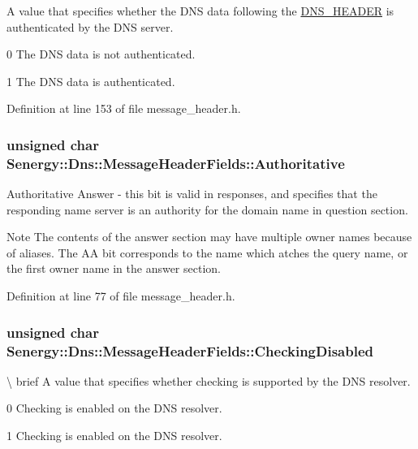 A value that specifies whether the D\-N\-S data following the \hyperlink{struct_d_n_s___h_e_a_d_e_r}{D\-N\-S\-\_\-\-H\-E\-A\-D\-E\-R} is authenticated by the D\-N\-S server. 

0 The D\-N\-S data is not authenticated.

1 The D\-N\-S data is authenticated. 

Definition at line 153 of file message\-\_\-header.\-h.

\hypertarget{struct_senergy_1_1_dns_1_1_message_header_fields_a706fe34b459a6aaacc28f0249213b013}{
\subsubsection[{Authoritative}]{\setlength{\rightskip}{0pt plus 5cm}unsigned char Senergy\-::\-Dns\-::\-Message\-Header\-Fields\-::\-Authoritative}}\label{struct_senergy_1_1_dns_1_1_message_header_fields_a706fe34b459a6aaacc28f0249213b013}


Authoritative Answer -\/ this bit is valid in responses, and specifies that the responding name server is an authority for the domain name in question section. 

\begin{DoxyNote}{Note}
The contents of the answer section may have multiple owner names because of aliases. The A\-A bit corresponds to the name which atches the query name, or the first owner name in the answer section. 
\end{DoxyNote}


Definition at line 77 of file message\-\_\-header.\-h.

\hypertarget{struct_senergy_1_1_dns_1_1_message_header_fields_a2c846064b4582f46a94bd90b32ef1cd9}{
\subsubsection[{Checking\-Disabled}]{\setlength{\rightskip}{0pt plus 5cm}unsigned char Senergy\-::\-Dns\-::\-Message\-Header\-Fields\-::\-Checking\-Disabled}}\label{struct_senergy_1_1_dns_1_1_message_header_fields_a2c846064b4582f46a94bd90b32ef1cd9}
\textbackslash{} brief A value that specifies whether checking is supported by the D\-N\-S resolver. \begin{DoxyVerb}      0               Checking is enabled on the DNS resolver.

      1               Checking is enabled on the DNS resolver.\end{DoxyVerb}
 

